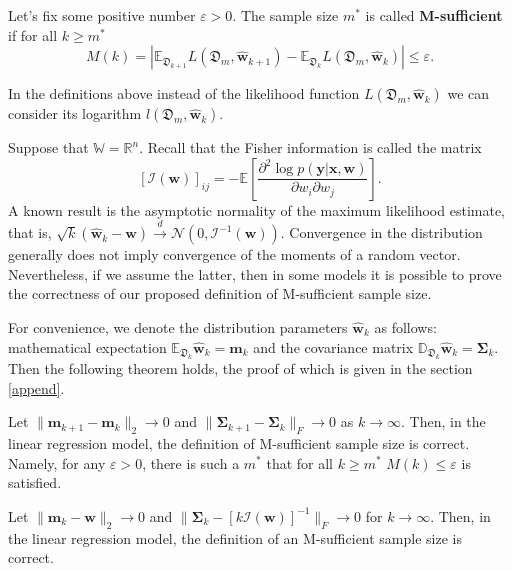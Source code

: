\documentclass[
11pt,%
tightenlines,%
twoside,%
onecolumn,%
nofloats,%
nobibnotes,%
nofootinbib,%
superscriptaddress,%
noshowpacs,%
centertags]%
{revtex4-2}
\begin{document}
\begin{definition}
    \label{sufficient-difference}
    Let's fix some positive number $\varepsilon > 0$. The sample size $m^*$ is called \textbf{M-sufficient} if for all $k\geqslant m^*$ 
    \[ M(k) = \left| \mathbb{E}_{\mathfrak{D}_{k+1}} L(\mathfrak{D}_m, \hat{\mathbf{w}}_{k+1}) - \mathbb{E}_{\mathfrak{D}_k} L(\mathfrak{D}_m, \hat{\mathbf{w}}_{k}) \right| \leqslant \varepsilon. \]
\end{definition}
In the definitions above instead of the likelihood function $L(\mathfrak{D}_m, \hat{\mathbf{w}}_{k})$ we can consider its logarithm $l(\mathfrak{D}_m, \hat{\mathbf{w}}_{k})$.

Suppose that $\mathbb{W} = \mathbb{R}^n$. Recall that the Fisher information is called the matrix
\[ \left[\mathcal{I}(\mathbf{w})\right]_{ij} = - \mathbb{E}\left[ \dfrac{\partial^2 \log p(\mathbf{y} | \mathbf{x}, \mathbf{w})}{\partial w_i \partial w_j} \right]. \]
A known result is the asymptotic normality of the maximum likelihood estimate, that is, $\sqrt{k}\left(\hat{\mathbf{w}}_k -\mathbf{w}\right)\xrightarrow{d}\mathcal{N}\left(0, \mathcal{I}^{-1}(\mathbf{w})\right)$. Convergence in the distribution generally does not imply convergence of the moments of a random vector. Nevertheless, if we assume the latter, then in some models it is possible to prove the correctness of our proposed definition of M-sufficient sample size.

For convenience, we denote the distribution parameters $\hat{\mathbf{w}}_k$ as follows: mathematical expectation $\mathbb{E}_{\mathfrak{D}_k}\hat{\mathbf{w}}_k=\mathbf{m}_k$ and the covariance matrix $\mathbb{D}_{\mathfrak{D}_k}\hat{\mathbf{w}}_k = \mathbf{\Sigma}_k$. Then the following theorem holds, the proof of which is given in the section \ref{append}.

\begin{theorem}[Kiselev, 2023]\label{theorem1}
    Let $\|\mathbf{m}_{k+1} - \mathbf{m}_k\|_2 \to 0$ and $\|\mathbf{\Sigma}_{k+1} - \mathbf{\Sigma}_k\|_{F}\to 0$ as $k\to \infty$. Then, in the linear regression model, the definition of M-sufficient sample size is correct. Namely, for any $\varepsilon > 0$, there is such a $m^*$ that for all $k\geqslant m^*$ $M(k)\leqslant\varepsilon$ is satisfied.
\end{theorem}

\begin{corollary}
    Let $\|\mathbf{m}_k - \mathbf{w}\|_2\to 0$ and $\|\mathbf{\Sigma}_k - \left[k\mathcal{I}(\mathbf{w})\right]^{-1}\|_{F}\to 0$ for $k \to \infty$. Then, in the linear regression model, the definition of an M-sufficient sample size is correct. 
\end{corollary}
\end{document}
